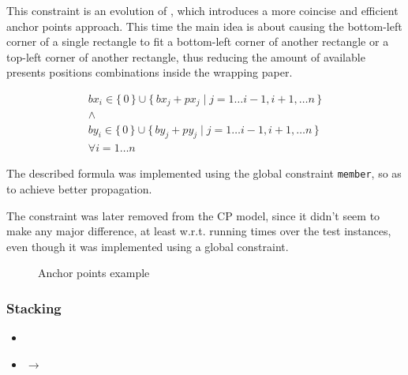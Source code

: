 \documentclass[a4paper,10pt]{article}
\newcounter{subsubsubsection}[subsubsection]
\begin{document}
 \label{sec:anchor-points-v2}
This constraint is an evolution of , which introduces a more coincise and efficient anchor points approach.
This time the main idea is about causing the bottom-left corner of a single rectangle to fit a bottom-left corner of another rectangle or a top-left corner of another rectangle, thus reducing the amount of available presents positions combinations inside the wrapping paper.

\begin{gather*}
   bx_{i} \in \{\,0\,\} \cup \{\, bx_{j} + px_{j} \mid j = 1 \dots i - 1, i + 1, \dots n \,\} \\
   \wedge \\
   by_{i} \in \{\,0\,\} \cup \{\, by_{j} + py_{j} \mid j = 1 \dots i - 1, i + 1, \dots n \,\} \\
   \forall{i = 1 \dots n}
\end{gather*}

The described formula was implemented using the global constraint \texttt{member}, so as to achieve better propagation. 

The constraint was later removed from the CP model, since it didn't seem to make any major difference, at least w.r.t. running times over the test instances, even though it was implemented using a global constraint.

\begin{figure}[h]
   \centering
   \caption{Anchor points example}
\end{figure}

\subsubsection{Stacking}
\begin{itemize}
   \item {}
   \item {} $\rightarrow$ 
\end{itemize}
\end{document}

